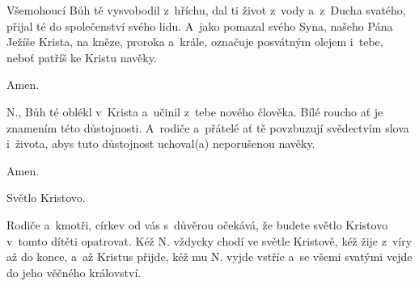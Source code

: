 
Všemohoucí Bůh tě vysvobodil z~hříchu, dal ti život z~vody a~z~Ducha svatého,
přijal té do společenství svého lidu.
A~jako pomazal svého Syna, našeho Pána Ježíše Krista,
na kněze, proroka a~krále, označuje posvátným olejem i~tebe, neboť patříš ke Kristu navěky.

 Amen.


\pars{}

 {\color{red}N.}, Bůh té oblékl v~Krista a~učinil z~tebe nového člověka.
Bílé roucho ať je znamením této důstojnosti.
A~rodiče a~přátelé ať tě povzbuzují svědectvím slova i~života,
abys tuto důstojnost uchoval(a) neporušenou navěky.

 Amen.


\pars{}

 Světlo Kristovo.


 Rodiče a~kmotři, církev od vás s~důvěrou očekává, že budete světlo Kristovo v~tomto dítěti opatrovat.
Kéž {\color{red}N.} vždycky chodí ve světle Kristově, kéž žije z~víry až do konce, a~až Kristus přijde,
kéž mu {\color{red}N.} vyjde vstříc a~se všemi svatými vejde do jeho věčného království.
